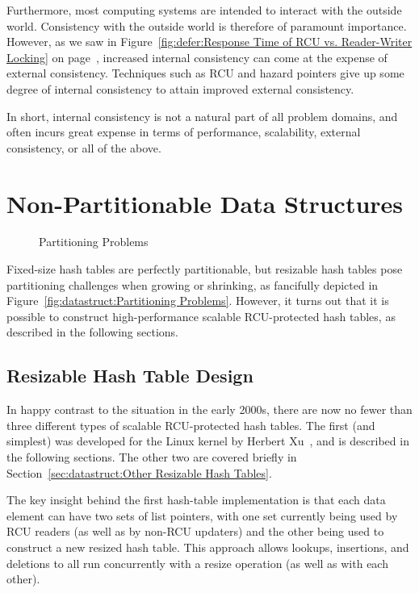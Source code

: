 Furthermore, most computing systems are intended to interact with
the outside world.
Consistency with the outside world is therefore of paramount importance.
However, as we saw in
Figure~\ref{fig:defer:Response Time of RCU vs. Reader-Writer Locking}
on
page~\pageref{fig:defer:Response Time of RCU vs. Reader-Writer Locking},
increased internal consistency can come at the expense of external
consistency.
Techniques such as RCU and hazard pointers give up some degree of
internal consistency to attain improved external consistency.

In short, internal consistency is not a natural part of all problem domains,
and often incurs great expense in terms of performance,
scalability, external consistency, or all of the above.

\section{Non-Partitionable Data Structures}
\label{sec:datastruct:Non-Partitionable Data Structures}

\begin{figure}[tb]
\centering
{}
\caption{Partitioning Problems}
\end{figure}

Fixed-size hash tables are perfectly partitionable, but resizable hash
tables pose partitioning challenges when growing or shrinking, as
fancifully depicted in
Figure~\ref{fig:datastruct:Partitioning Problems}.
However, it turns out that it is possible to construct high-performance
scalable RCU-protected hash tables, as described in the following sections.

\subsection{Resizable Hash Table Design}
\label{sec:datastruct:Resizable Hash Table Design}

In happy contrast to the situation in the early 2000s, there are now
no fewer than three different types of scalable RCU-protected hash
tables.
The first (and simplest) was developed for the Linux kernel by
Herbert Xu~\cite{HerbertXu2010RCUResizeHash}, and is described in the
following sections.
The other two are covered briefly in
Section~\ref{sec:datastruct:Other Resizable Hash Tables}.

The key insight behind the first hash-table implementation is that
each data element can have two sets of list pointers, with one set
currently being used by RCU readers (as well as by non-RCU updaters)
and the other being used to construct a new resized hash table.
This approach allows lookups, insertions, and deletions to all run
concurrently with a resize operation (as well as with each other).

